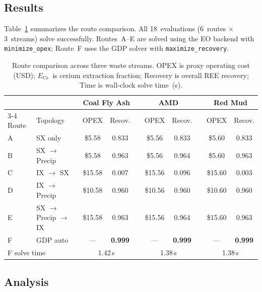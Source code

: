 \documentclass[11pt]{article}
\begin{document}
\subsection{Results}

Table~\ref{tab:gdp_results} summarizes the route comparison.  All
18~evaluations (6~routes $\times$ 3~streams) solve successfully.
Routes~A--E are solved using the EO backend with
\texttt{minimize\_opex}; Route~F uses the GDP solver with
\texttt{maximize\_recovery}.

\begin{table}[t]
  \centering
  \caption{Route comparison across three waste streams.  OPEX is proxy
    operating cost (USD); $E_{\text{Ce}}$~is cerium extraction fraction;
    Recovery is overall REE recovery; Time is wall-clock solve
    time~(s).}
  \label{tab:gdp_results}
  \begin{tabular}{@{}llcccccccc@{}}
    \toprule
    & & \multicolumn{2}{c}{Coal Fly Ash}
    & & \multicolumn{2}{c}{AMD}
    & & \multicolumn{2}{c}{Red Mud} \\
    \cmidrule{3-4} \cmidrule{6-7} \cmidrule{9-10}
    Route & Topology
      & OPEX & Recov.
      & & OPEX & Recov.
      & & OPEX & Recov. \\
    \midrule
    A & SX only
      & \$5.58 & 0.833
      & & \$5.56 & 0.833
      & & \$5.60 & 0.833 \\
    B & SX $\rightarrow$ Precip
      & \$5.58 & 0.963
      & & \$5.56 & 0.964
      & & \$5.60 & 0.963 \\
    C & IX $\rightarrow$ SX
      & \$15.58 & 0.007
      & & \$15.56 & 0.096
      & & \$15.60 & 0.003 \\
    D & IX $\rightarrow$ Precip
      & \$10.58 & 0.960
      & & \$10.56 & 0.960
      & & \$10.60 & 0.960 \\
    E & SX $\rightarrow$ Precip $\rightarrow$ IX
      & \$15.58 & 0.963
      & & \$15.56 & 0.964
      & & \$15.60 & 0.963 \\
    F & GDP auto
      & ---    & \textbf{0.999}
      & & ---    & \textbf{0.999}
      & & ---    & \textbf{0.999} \\
    \midrule
    \multicolumn{2}{l}{F solve time}
      & \multicolumn{2}{c}{1.42\,s}
      & & \multicolumn{2}{c}{1.38\,s}
      & & \multicolumn{2}{c}{1.38\,s} \\
    \bottomrule
  \end{tabular}
\end{table}

\subsection{Analysis}
\end{document}
